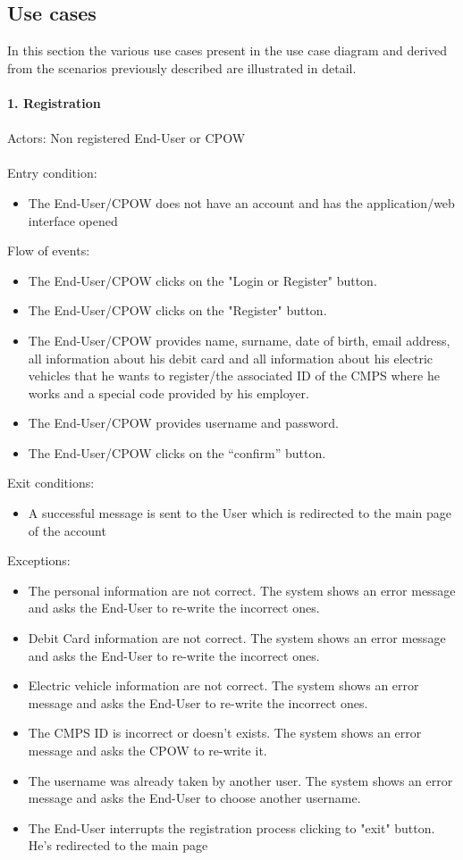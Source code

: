 \documentclass[a4paper]{report}
\begin{document}
\subsection{Use cases}
In this section the various use cases present in the use case diagram and derived from the scenarios previously described are illustrated in detail.\\ \\
\textbf{1. Registration}\label{uc:1}
\\
\\
Actors: Non registered End-User or CPOW\\ \\
Entry condition: 
\begin{itemize}
\item The End-User/CPOW does not have an account and has the application/web interface opened
\end{itemize}
Flow of events:
\begin{itemize}
\item The End-User/CPOW clicks on the "Login or Register" button.
\item The End-User/CPOW clicks on the "Register" button.
\item The End-User/CPOW provides name, surname, date of birth, email address, all information about his debit card and all information about his electric vehicles that he wants to register/the associated ID of the CMPS where he works and a special code provided by his employer.
\item The End-User/CPOW provides username and password. 
\item The End-User/CPOW clicks on the “confirm” button.
\end{itemize}
Exit conditions: 
\begin{itemize}
\item A successful message is sent to the User which is redirected to the main page of the account 
\end{itemize}
Exceptions: 
\begin{itemize}
\item The personal information are not correct. The system shows an error message and asks the End-User to re-write the incorrect ones.
\item Debit Card information are not correct. The system shows an error message and asks the End-User to re-write the incorrect ones.
\item Electric vehicle information are not correct. The system shows an error message and asks the End-User to re-write the incorrect ones.
\item The CMPS ID is incorrect or doesn't exists. The system shows an error message and asks the CPOW to re-write it.
\item The username was already taken by another user. The system shows an error message and asks the End-User to choose another username.
\item The End-User interrupts the registration process clicking to "exit" button. He's redirected to the main page
\end{itemize}
\end{document}
